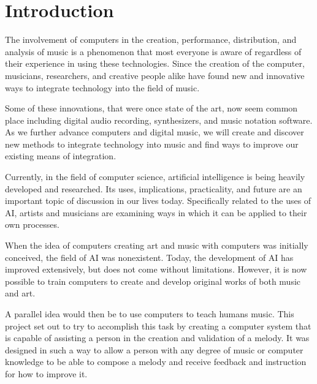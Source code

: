 \chapter{Introduction}
\label{ch:introduction}

The involvement of computers in the creation, performance, distribution, and analysis of music is a phenomenon that most everyone is aware of regardless of their experience in using these technologies.  Since the creation of the computer, musicians, researchers, and creative people alike have found new and innovative ways to integrate technology into the field of music.

\vspace{\baselineskip}

Some of these innovations, that were once state of the art, now seem common place including digital audio recording, synthesizers, and music notation software.  As we further advance computers and digital music, we will create and discover new methods to integrate technology into music and find ways to improve our existing means of integration.

\vspace{\baselineskip}

Currently, in the field of computer science, artificial intelligence is being heavily developed and researched.  Its uses, implications, practicality, and future are an important topic of discussion in our lives today.  Specifically related to the uses of AI, artists and musicians are examining ways in which it can be applied to their own processes.

\vspace{\baselineskip}

When the idea of computers creating art and music with computers was initially conceived, the field of AI was nonexistent.  Today, the development of AI has improved extensively, but does not come without limitations.  However, it is now possible to train computers to create and develop original works of both music and art.

\vspace{\baselineskip}

A parallel idea would then be to use computers to teach humans music.  This project set out to try to accomplish this task by creating a computer system that is capable of assisting a person in the creation and validation of a melody.  It was designed in such a way to allow a person with any degree of music or computer knowledge to be able to compose a melody and receive feedback and instruction for how to improve it.

